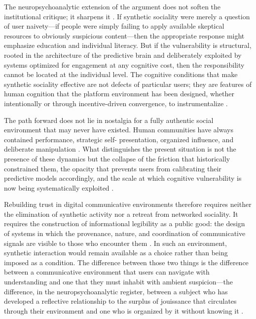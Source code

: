 \documentclass[12pt,a4paper]{article}
\begin{document}
The neuropsychoanalytic extension of the argument does not soften the institutional critique;
it sharpens it \citep{dallaglio2024}. If synthetic sociality were merely a question of user
naivety---if people were simply failing to apply available skeptical resources to obviously
suspicious content---then the appropriate response might emphasize education and individual
literacy. But if the vulnerability is structural, rooted in the architecture of the predictive
brain and deliberately exploited by systems optimized for engagement at any cognitive cost, then
the responsibility cannot be located at the individual level. The cognitive conditions that make
synthetic sociality effective are not defects of particular users; they are features of human
cognition that the platform environment has been designed, whether intentionally or through
incentive-driven convergence, to instrumentalize \citep{friston2010,zuboff2019}.

The path forward does not lie in nostalgia for a fully authentic social environment that may
never have existed. Human communities have always contained performance, strategic self-
presentation, organized influence, and deliberate manipulation \citep{debord1967}. What
distinguishes the present situation is not the presence of these dynamics but the collapse of
the friction that historically constrained them, the opacity that prevents users from calibrating
their predictive models accordingly, and the scale at which cognitive vulnerability is now being
systematically exploited \citep{vosoughi2018,dallaglio2024}.

Rebuilding trust in digital communicative environments therefore requires neither the elimination
of synthetic activity nor a retreat from networked sociality. It requires the construction of
informational legibility as a public good: the design of systems in which the provenance, nature,
and coordination of communicative signals are visible to those who encounter them
\citep{gillespie2018,noble2018}. In such an environment, synthetic interaction would remain
available as a choice rather than being imposed as a condition. The difference between those two
things is the difference between a communicative environment that users can navigate with
understanding and one that they must inhabit with ambient suspicion---the difference, in the
neuropsychoanalytic register, between a subject who has developed a reflective relationship to
the surplus of jouissance that circulates through their environment and one who is organized by
it without knowing it \citep{lacan2006,dallaglio2024}.
\end{document}
